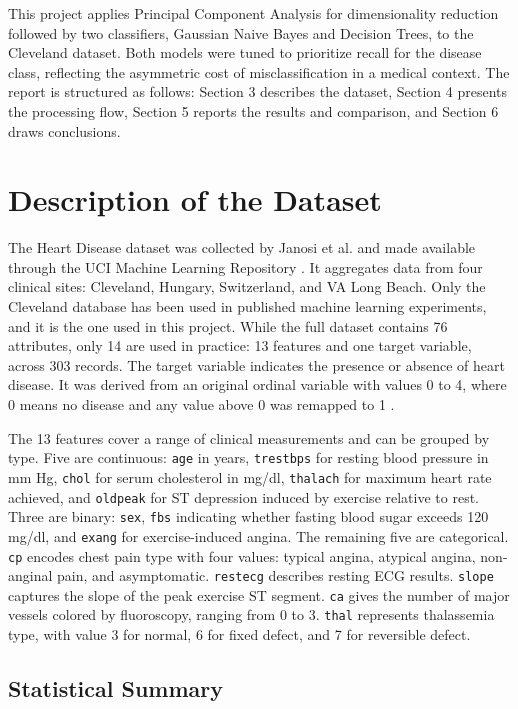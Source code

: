 \documentclass{article}
\begin{document}
This project applies Principal Component Analysis for dimensionality reduction followed by two classifiers, Gaussian Naive Bayes and Decision Trees, to the Cleveland dataset. Both models were tuned to prioritize recall for the disease class, reflecting the asymmetric cost of misclassification in a medical context. The report is structured as follows: Section 3 describes the dataset, Section 4 presents the processing flow, Section 5 reports the results and comparison, and Section 6 draws conclusions.

\section{Description of the Dataset}

The Heart Disease dataset was collected by Janosi et al. \cite{janosi1989} and made available through the UCI Machine Learning Repository \cite{uci}. It aggregates data from four clinical sites: Cleveland, Hungary, Switzerland, and VA Long Beach. Only the Cleveland database has been used in published machine learning experiments, and it is the one used in this project. While the full dataset contains 76 attributes, only 14 are used in practice: 13 features and one target variable, across 303 records. The target variable indicates the presence or absence of heart disease. It was derived from an original ordinal variable with values 0 to 4, where 0 means no disease and any value above 0 was remapped to 1 \cite{uci}.

The 13 features cover a range of clinical measurements and can be grouped by type. Five are continuous: \texttt{age} in years, \texttt{trestbps} for resting blood pressure in mm Hg, \texttt{chol} for serum cholesterol in mg/dl, \texttt{thalach} for maximum heart rate achieved, and \texttt{oldpeak} for ST depression induced by exercise relative to rest. Three are binary: \texttt{sex}, \texttt{fbs} indicating whether fasting blood sugar exceeds 120 mg/dl, and \texttt{exang} for exercise-induced angina. The remaining five are categorical. \texttt{cp} encodes chest pain type with four values: typical angina, atypical angina, non-anginal pain, and asymptomatic. \texttt{restecg} describes resting ECG results. \texttt{slope} captures the slope of the peak exercise ST segment. \texttt{ca} gives the number of major vessels colored by fluoroscopy, ranging from 0 to 3. \texttt{thal} represents thalassemia type, with value 3 for normal, 6 for fixed defect, and 7 for reversible defect.

\subsection*{Statistical Summary}
\end{document}
